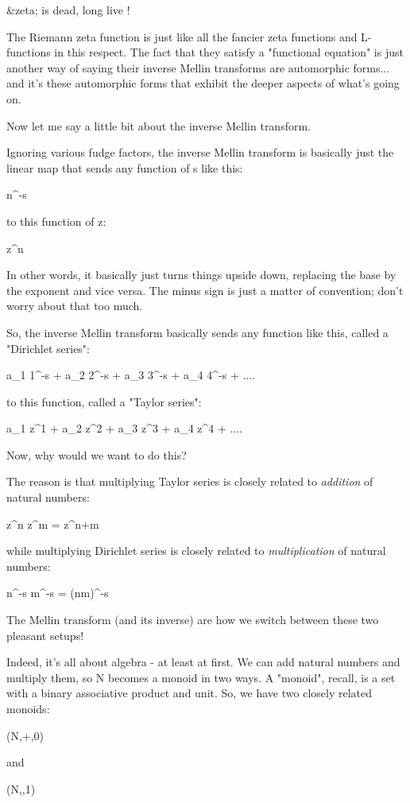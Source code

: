 &zeta; is dead, long live \theta !

The Riemann zeta function is just like all the fancier zeta functions and 
L-functions in this respect.  The fact that they satisfy a "functional 
equation" is just another way of saying their inverse
Mellin transforms are 
automorphic forms... and it's these automorphic forms that exhibit the 
deeper aspects of what's going on.

Now let me say a little bit about the inverse Mellin transform.

Ignoring various fudge factors, the inverse 
Mellin transform is basically just 
the linear map that sends any function of s like this:

n^{-s}

to this function of z:

z^{n}

In other words, it basically just turns things upside down, replacing the 
base by the exponent and vice versa.  The minus sign is just a matter of 
convention; don't worry about that too much.

So, the inverse
Mellin transform basically sends any function like this, called a 
"Dirichlet series":

a_{1} 1^{-s} + a_{2} 2^{-s} + a_{3} 3^{-s} + a_{4} 4^{-s} + ....

to this function, called a "Taylor series":

a_{1} z^{1} + a_{2} z^{2} + a_{3} z^{3} + a_{4} z^{4} + ....

Now, why would we want to do this? 

The reason is that multiplying Taylor series is closely related 
to \emph{addition} 
of natural numbers:

z^{n} z^{m} = z^{n+m}

while multiplying Dirichlet series is closely related to 
\emph{multiplication}
of natural numbers:

n^{-s} m^{-s} = (nm)^{-s}

The Mellin transform (and its inverse) are how we switch between these two 
pleasant setups!

Indeed, it's all about algebra - at least at first.  We can add natural 
numbers and multiply them, so N becomes a monoid in two ways.  A "monoid", 
recall, is a set with a binary associative product and unit.  So, we have 
two closely related monoids:

(N,+,0)

and 

(N,\times ,1)

